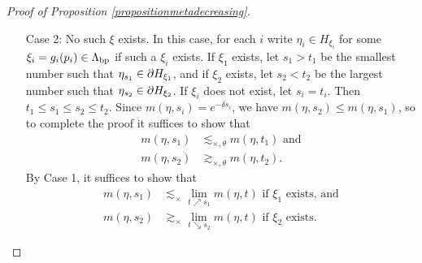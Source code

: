 \begin{proof}[Proof of Proposition \ref{propositionmetadecreasing}]
\begin{itemize}
To demonstrate \eqref{ETSmetadecreasing}, let $\zeta = g^{-1}(\eta)\in\Lambda$. We have
\[
\lb \bp|\zeta\rb_\zero = \lb \xi|\eta\rb_{g(\zero)} \asymp_\plus \lb \xi|\eta\rb_\zero - \dogo g \asymp_\plus \lb \xi|\eta\rb_\zero - t_\xi = t + \theta
\]
and thus
\[
\Dist_\bp(\zero,\zeta) \asymp_\times e^{t + \theta}.
\]
Since $\bp$ is a bounded parabolic point, there exists $h_\zeta\in G_\bp$ such that $\Dist_\bp(h_\zeta(\zero),\zeta) \lesssim_\times 1$. Denoting all implied constants by $C$, we have
\begin{align*}
C^{-1} e^{t + \theta} - C \leq \Dist_\bp(\zero,\zeta) - \Dist_\bp(h_\zeta(\zero),\zeta) 
&\leq \|h_\zeta\|_\bp\\ 
&\leq \Dist_\bp(\zero,\zeta) + \Dist_\bp(h_\zeta(\zero),\zeta) \leq C e^{t + \theta} + C.
\end{align*}
Choosing $\theta \geq \log(4C)$, we have
\[
2 e^t \leq \|h_\zeta\|_\bp \leq 2C e^{t + \theta} \text{ unless $e^{t + \theta} \leq 2C^2$}.
\]
If $2 e^t \leq \|h_\zeta\|_\bp \leq 2C e^{t + \theta}$, then for all $h\in G_\bp$ satisfying $\|h\|_\bp\leq e^t$ we have $e^t \leq \|h_\zeta h\|_\bp \lesssim_{\times,\theta} e^t$; it follows that
\[
\II_\bp(e^t) \geq \sum_{h\in G_\bp} \|h_\zeta h\|_\bp^{-2\delta} \asymp_{\times,\theta} e^{-2\delta t} \NN_\bp(e^t),
\]
thus demonstrating \eqref{ETSmetadecreasing}. On the other hand, if $e^{t + \theta} \leq 2C^2$, then both sides of \eqref{ETSmetadecreasing} are bounded from above and below independent of $t$.
\item[Case 2:] No such $\xi$ exists. In this case, for each $i$ write $\eta_i\in H_{\xi_i}$ for some $\xi_i = g_i(p_i)\in\Lambda_{\mathrm{bp}}$ if such a $\xi_i$ exists. If $\xi_1$ exists, let $s_1 > t_1$ be the smallest number such that $\eta_{s_1}\in\partial H_{\xi_1}$, and if $\xi_2$ exists, let $s_2 < t_2$ be the largest number such that $\eta_{s_2}\in \partial H_{\xi_2}$. If $\xi_i$ does not exist, let $s_i = t_i$. Then $t_1 \leq s_1 \leq s_2 \leq t_2$. Since $m(\eta,s_i) = e^{-\delta s_i}$, we have $m(\eta,s_2) \leq m(\eta,s_1)$, so to complete the proof it suffices to show that
\begin{align*}
m(\eta,s_1) &\lesssim_{\times,\theta} m(\eta,t_1) \text{ and}\\
m(\eta,s_2) &\gtrsim_{\times,\theta} m(\eta,t_2).
\end{align*}
By Case 1, it suffices to show that
\begin{align*}
m(\eta,s_1) &\lesssim_\times \lim_{t\nearrow s_1}m(\eta,t) \text{ if $\xi_1$ exists, and}\\
m(\eta,s_2) &\gtrsim_\times \lim_{t\searrow s_2} m(\eta,t) \text{ if $\xi_2$ exists.}

\end{align*}
\end{itemize}
\end{proof}
